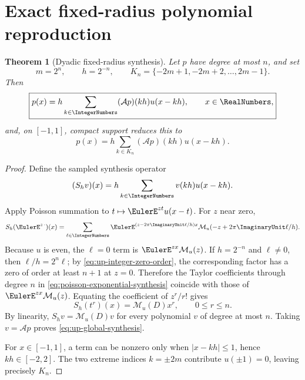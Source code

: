 \documentclass[11pt,oneside]{book}
\numberwithin{equation}{chapter}
\newtheorem{theorem}{Theorem}[chapter]
\theoremstyle{definition}
\theoremstyle{remark}
\newcommand{\App}{\mathcal A}
\newcommand{\MGF}{\mathcal M}
\begin{document}
\section{Exact fixed-radius polynomial reproduction}

\begin{theorem}[Dyadic fixed-radius synthesis]
\label{thm:up-polynomial-synthesis}
Let $p$ have degree at most $n$, and set
\begin{equation}
 m=2^n,
 \qquad h=2^{-n},
 \qquad K_n=\{-2m+1,-2m+2,\ldots,2m-1\}.
 \label{eq:up-synthesis-grid}
\end{equation}
Then
\begin{equation}
 \boxed{
 p(x)=h\sum_{k\in\IntegerNumbers}(\App p)(kh)u(x-kh),
 \qquad x\in\RealNumbers,}
 \label{eq:up-global-synthesis}
\end{equation}
and, on $[-1,1]$, compact support reduces this to
\begin{equation}
 \boxed{
 p(x)=h\sum_{k\in K_n}(\App p)(kh)u(x-kh).}
 \label{eq:up-finite-synthesis}
\end{equation}
\end{theorem}

\begin{proof}
Define the sampled synthesis operator
\[
 (S_hv)(x)=h\sum_{k\in\IntegerNumbers}v(kh)u(x-kh).
\]
Apply Poisson summation to $t\mapsto\EulerE^{zt}u(x-t)$.  For $z$ near zero,
\begin{equation}
 S_h(\EulerE^{z\,\cdot})(x)
 =\sum_{\ell\in\IntegerNumbers}
   \EulerE^{(z-2\pi\ImaginaryUnit\ell/h)x}
   \MGF_u(-z+2\pi\ImaginaryUnit\ell/h).
 \label{eq:poisson-exponential-synthesis}
\end{equation}
Because $u$ is even, the $\ell=0$ term is
$\EulerE^{zx}\MGF_u(z)$.  If $h=2^{-n}$ and $\ell\ne0$, then
$\ell/h=2^n\ell$; by \eqref{eq:up-integer-zero-order}, the corresponding
factor has a zero of order at least $n+1$ at $z=0$.  Therefore the Taylor
coefficients through degree $n$ in \eqref{eq:poisson-exponential-synthesis}
coincide with those of $\EulerE^{zx}\MGF_u(z)$.  Equating the coefficient of
$z^r/r!$ gives
\begin{equation}
 S_h(t^r)(x)=\MGF_u(D)x^r,
 \qquad 0\le r\le n.
 \label{eq:sampled-moment-operator}
\end{equation}
By linearity, $S_hv=\MGF_u(D)v$ for every polynomial $v$ of degree at most
$n$.  Taking $v=\App p$ proves \eqref{eq:up-global-synthesis}.

For $x\in[-1,1]$, a term can be nonzero only when
$|x-kh|\le1$, hence $kh\in[-2,2]$.  The two extreme indices
$k=\pm2m$ contribute $u(\pm1)=0$, leaving precisely $K_n$.
\end{proof}
\end{document}
